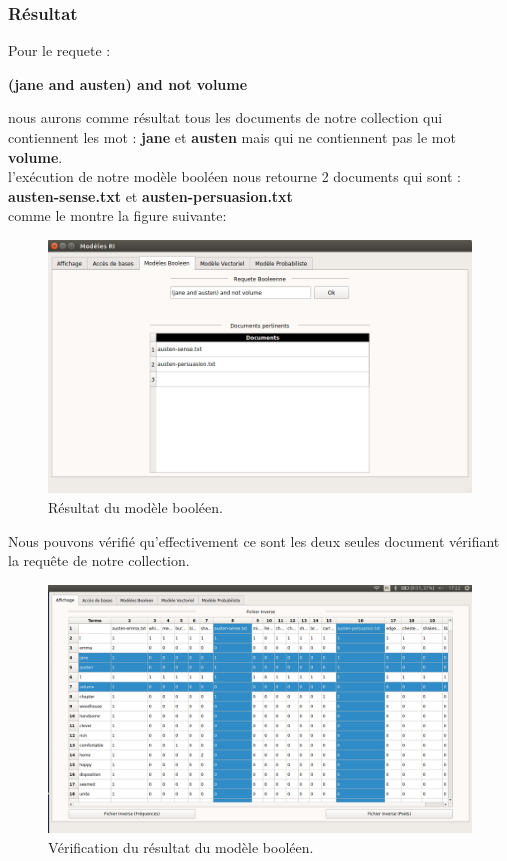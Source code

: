 \documentclass[12pt,a4paper,oneside]{article}
\begin{document}
\subsubsection*{Résultat}
Pour le requete :
\begin{center}
	\textbf{(jane and austen) and not volume}
\end{center} 

nous aurons comme résultat tous les documents de notre collection qui contiennent les mot : \textbf{jane} et \textbf{austen} mais qui ne contiennent pas le mot \textbf{volume}.\\

l'exécution de notre modèle booléen nous retourne 2 documents qui sont : \textbf{austen-sense.txt} et \textbf{austen-persuasion.txt}\\

comme le montre la figure suivante:
	\begin{figure}[H]
		\centering
		\includegraphics[scale=0.4]{images/modeleB.png}
		\caption{Résultat du modèle booléen.}
	\end{figure}
	
Nous pouvons vérifié qu'effectivement ce sont les deux seules document vérifiant la requête de notre collection.
	\begin{figure}[H]
		\centering
		\includegraphics[scale=0.3]{images/modeleB2.png}
		\caption{Vérification du résultat du modèle booléen.}
	\end{figure}
\end{document}
